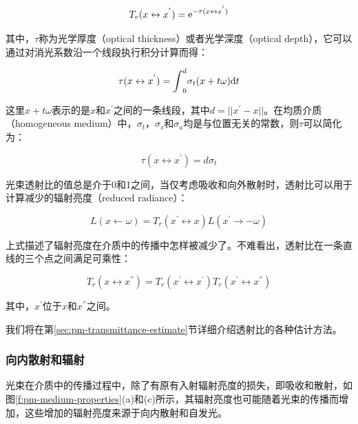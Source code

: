 \begin{equation}\label{e:pm-transmittance}
	T_r(x\leftrightarrow x^{'})={\rm e}^{-\tau(x\leftrightarrow x^{'})}
\end{equation}

\noindent 其中，$\tau$称为光学厚度（optical thickness）或者光学深度（optical depth），它可以通过对消光系数沿一个线段执行积分计算而得：

\begin{equation}
	\tau(x\leftrightarrow x^{'})={\rm \int}^{d}_{0}\sigma_t(x+t{\omega}){\rm d}t
\end{equation}

\noindent 这里$x+t{\omega}$表示的是$x$和$x^{'}$之间的一条线段，其中$d=||x^{'}-x||$。在均质介质（homogeneous medium）中，$\sigma_t$，$\sigma_s$和$\sigma_a$均是与位置无关的常数，则$\tau$可以简化为：

\begin{equation}
	\tau(x\leftrightarrow x^{'})=d\sigma_t
\end{equation}

光束透射比的值总是介于0和1之间，当仅考虑吸收和向外散射时，透射比可以用于计算减少的辐射亮度（reduced radiance）：

\begin{equation}
	L(x\leftarrow{\omega})=T_r(x^{'}\leftrightarrow x)L(x^{'}\to-{\omega})
\end{equation}

上式描述了辐射亮度在介质中的传播中怎样被减少了。不难看出，透射比在一条直线的三个点之间满足可乘性：

\begin{equation}
	T_r(x\leftrightarrow x^{''})=T_r(x^{'}\leftrightarrow x^{'})T_r(x^{'}\leftrightarrow x^{''})
\end{equation}

\noindent 其中，$x^{'}$位于$x$和$x^{''}$之间。

我们将在第\ref{sec:pm-transmittance-estimate}节详细介绍透射比的各种估计方法。




\subsubsection{向内散射和辐射}
光束在介质中的传播过程中，除了有原有入射辐射亮度的损失，即吸收和散射，如图\ref{f:pm-medium-properties}(a)和(c)所示，其辐射亮度也可能随着光束的传播而增加，这些增加的辐射亮度来源于向内散射和自发光。

